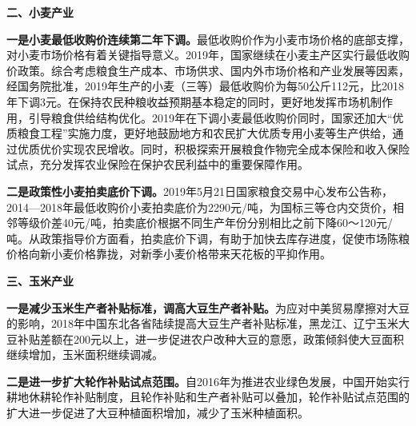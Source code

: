 \documentclass{progbookcn}
\begin{document}
\textbf{二、小麦产业}

\textbf{一是小麦最低收购价连续第二年下调。}最低收购价作为小麦市场价格的底部支撑，对小麦市场价格有着关键指导意义。2019年，国家继续在小麦主产区实行最低收购价政策。综合考虑粮食生产成本、市场供求、国内外市场价格和产业发展等因素，经国务院批准，2019年生产的小麦（三等）最低收购价为每50公斤112元，比2018年下调3元。在保持农民种粮收益预期基本稳定的同时，更好地发挥市场机制作用，引导粮食供给结构优化。2019年在下调小麦最低收购价同时，国家还加大“优质粮食工程”实施力度，更好地鼓励地方和农民扩大优质专用小麦等生产供给，通过优质优价实现农民增收。同时，积极探索开展粮食作物完全成本保险和收入保险试点，充分发挥农业保险在保护农民利益中的重要保障作用。

\textbf{二是政策性小麦拍卖底价下调。}2019年5月21日国家粮食交易中心发布公告称，2014—2018年最低收购价小麦拍卖底价为2290元/吨，为国标三等仓内交货价，相邻等级价差40元/吨，拍卖底价根据不同生产年份分别相比之前下降60～120元/吨。从政策指导价方面看，拍卖底价下调，有助于加快去库存进度，促使市场陈粮价格向新小麦价格靠拢，对新季小麦价格带来天花板的平抑作用。

\textbf{三、玉米产业}

\textbf{一是减少玉米生产者补贴标准，调高大豆生产者补贴。}为应对中美贸易摩擦对大豆的影响，2018年中国东北各省陆续提高大豆生产者补贴标准，黑龙江、辽宁玉米大豆补贴差额在200元以上，进一步促进农户改种大豆的意愿，政策倾斜使大豆面积继续增加，玉米面积继续调减。

\textbf{二是进一步扩大轮作补贴试点范围。}自2016年为推进农业绿色发展，中国开始实行耕地休耕轮作补贴制度，且轮作补贴和生产者补贴可以叠加，轮作补贴试点范围的扩大进一步促进了大豆种植面积增加，减少了玉米种植面积。


\begin{table}[]
\centering
{}
\end{table}
\end{document}
